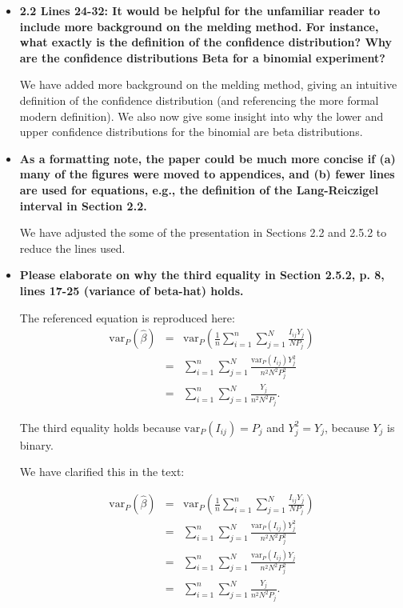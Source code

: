 \documentclass[11pt]{article}
\begin{document}
\begin{itemize}
\begin{itemize}
        \item \textbf{2.2 Lines 24-32: It would be helpful for the unfamiliar reader to include more background on the melding method. For instance, what exactly is the definition of the confidence distribution? Why are the confidence distributions Beta for a binomial experiment?}
        
       We have added more background on the melding method, giving an intuitive definition of the confidence distribution (and referencing the more formal modern definition).
       We also now give some insight into why the lower and upper confidence distributions for the binomial are beta distributions.

        \item \textbf{As a formatting note, the paper could be much more concise if (a) many of the figures were moved to appendices, and (b) fewer lines are used for equations, e.g., the definition of the Lang-Reiczigel interval in Section 2.2.}
        
        We have adjusted the some of the presentation in Sections 2.2 and 2.5.2  to reduce the lines used.

        \item \textbf{Please elaborate on why the third equality in Section 2.5.2, p. 8, lines 17-25 (variance of  beta-hat) holds.}

        The referenced equation is reproduced here:
        \begin{eqnarray*}
        \textrm{var}_P \left(\hat{\beta} \right) & = & \textrm{var}_P \left(  \frac{1}{n}  \sum_{i=1}^{n} \sum_{j=1}^{N}  \frac{ I_{ij}  Y_j}{N P_j} \right)  \\
        & = &    \sum_{i=1}^{n} \sum_{j=1}^{N}  \frac{ \textrm{var}_P( I_{ij})  Y_j^2}{n^2 N^2 P_j^2}  \\
        & = &    \sum_{i=1}^{n} \sum_{j=1}^{N}  \frac{   Y_j}{n^2 N^2 P_j}.
        \end{eqnarray*}
        
        The third equality holds because \( \textrm{var}_P( I_{ij}) = P_j \) and \( Y_j^2= Y_j \), because \( Y_j \) is binary.
        
        We have clarified this in the text:
        
        \begin{eqnarray*}
        \textrm{var}_P \left(\hat{\beta} \right) & = & \textrm{var}_P \left(  \frac{1}{n}  \sum_{i=1}^{n} \sum_{j=1}^{N}  \frac{ I_{ij}  Y_j}{N P_j} \right)  \\
        & = &    \sum_{i=1}^{n} \sum_{j=1}^{N}  \frac{ \textrm{var}_P( I_{ij})  Y_j^2}{n^2 N^2 P_j^2}  \\
        & = &    \sum_{i=1}^{n} \sum_{j=1}^{N}  \frac{ \textrm{var}_P( I_{ij})  Y_j}{n^2 N^2 P_j^2}  \\
        & = &    \sum_{i=1}^{n} \sum_{j=1}^{N}  \frac{   Y_j}{n^2 N^2 P_j}.
        \end{eqnarray*}
        


\end{itemize}
\end{itemize}
\end{document}
